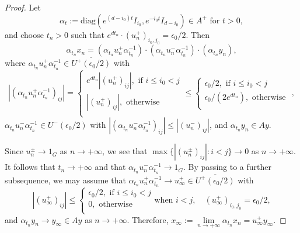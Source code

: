 \documentclass[10pt,a4paper]{amsart}
\newcommand{\diag}{\mathrm{diag}}
\begin{document}
\begin{proof}
	Let \begin{equation*}
		\alpha_t:=\diag(e^{(d-i_0)t}I_{i_0},e^{-i_0t}I_{d-i_0}) \in A^{+} \text{ for }t>0,
	\end{equation*}
	and choose $t_n>0$ such that $e^{dt_n}\cdot(u^+_n)_{i_0,j_0}=\epsilon_0/2$. Then \begin{equation*}
		\alpha_{t_n}x_n=(\alpha_{t_n}u_n^+\alpha_{t_n}^{-1})\cdot (\alpha_{t_n}u_n^-\alpha_{t_n}^{-1})\cdot (\alpha_{t_n}y_n),
	\end{equation*}
	where $\alpha_{t_n}u_n^+\alpha_{t_n}^{-1}\in \overline{U^+(\epsilon_0/2)}$ with 
	\begin{equation*}
		|(\alpha_{t_n}u_n^+\alpha_{t_n}^{-1})_{ij}|=\begin{cases}
			e^{dt_n}|(u_n^+)_{ij}|, \text{ if }i\leq i_0<j\\
			|(u_n^+)_{ij}|, \text{ otherwise }\\
		\end{cases}
		\leq\begin{cases}
			\epsilon_0/2, \text{ if }i\leq i_0<j\\
			\epsilon_0/(2e^{dt_n}), \text{ otherwise }\\
		\end{cases},
	\end{equation*}
	$\alpha_{t_n}u_n^-\alpha_{t_n}^{-1}\in U^-(\epsilon_0/2)$ with 
	$|(\alpha_{t_n}u_n^-\alpha_{t_n}^{-1})_{ij}|\leq |(u^-_n)_{ij}|$,
	and  $\alpha_{t_n}y_n\in Ay$. 
	
	
	
	
	Since $u_n^\pm\to 1_G$ as $n\to +\infty$, we see that $\max\{|(u^\pm_n)_{ij}|:i<j\}\to 0$ as $n\to +\infty$. It follows that $t_n\to +\infty$ and that $\alpha_{t_n}u_n^-\alpha_{t_n}^{-1}\to 1_G$. By passing to a further subsequence, we may assume that $\alpha_{t_n}u_n^+\alpha_{t_n}^{-1}\to u^+_{\infty}\in \overline{U^+(\epsilon_0/2)}$ with \begin{equation*}
		|(u_\infty^+)_{ij}|\leq\begin{cases}
			\epsilon_0/2, \text{ if }i\leq i_0<j\\
			0, \text{ otherwise }\\
		\end{cases} \text{when }i<j,\quad 
		(u_\infty^+)_{i_0,j_0}=\epsilon_0/2,
	\end{equation*}
	and $\alpha_{t_n}y_n\to y_{\infty}\in Ay$ as $n\to +\infty$. Therefore, $x_{\infty}:=\lim\limits_{n\to +\infty}\alpha_{t_n}x_n=u^+_{\infty}y_{\infty}$.
	

\end{proof}
\end{document}
